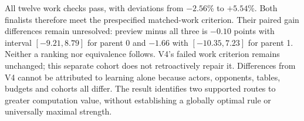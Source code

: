 All twelve work checks pass, with deviations from $-2.56$\% to $+5.54$\%.
Both finalists therefore meet the prespecified matched-work criterion.
Their paired gain differences remain unresolved: preview minus all three
is $-0.10$ points with interval $[-9.21,8.79]$ for parent 0 and $-1.66$
with $[-10.35,7.23]$ for parent 1. Neither a ranking nor equivalence follows.
V4's failed work criterion remains unchanged; this separate cohort does not
retroactively repair it. Differences from V4 cannot be attributed to learning
alone because actors, opponents, tables, budgets and cohorts all differ.
The result identifies two supported routes to greater computation value,
without establishing a globally optimal rule or universally maximal strength.
\FloatBarrier
